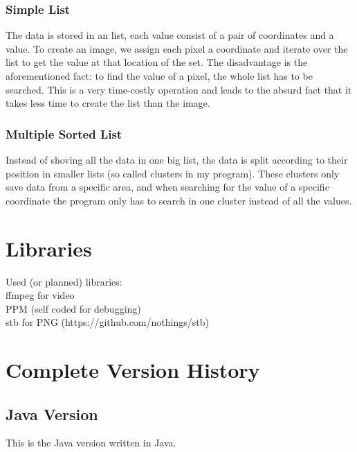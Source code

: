 \documentclass[10pt,a4paper,titlepage]{article}
\begin{document}
	\subsubsection{Simple List}
	The data is stored in an list, each value consist of a pair of coordinates and a value. To create an image, we assign each pixel a coordinate and iterate over the list to get the value at that location of the set. The disadvantage is the aforementioned fact: to find the value of a pixel, the whole list has to be searched. This is a very time-costly operation and leads to the absurd fact that it takes less time to create the list than the image.
	\subsubsection{Multiple Sorted List}
	Instead of shoving all the data in one big list, the data is split according to their position in smaller lists (so called clusters in my program). These clusters only save data from a specific area, and when searching for the value of a specific coordinate the program only has to search in one cluster instead of all the values.
	\begin{figure}[h!]
		\centering
		\caption{}
		\label{fig:cluster}
	\end{figure}
	\section{Libraries}
	Used (or planned) libraries:\\
	ffmpeg for video\\
	PPM (self coded for debugging)\\
	stb for PNG (https://github.com/nothings/stb)\\
	
	\appendix
	\section{Complete Version History}\label{appendix:version_history}
	\subsection{Java Version}
	This is the Java version written in Java.
\end{document}
